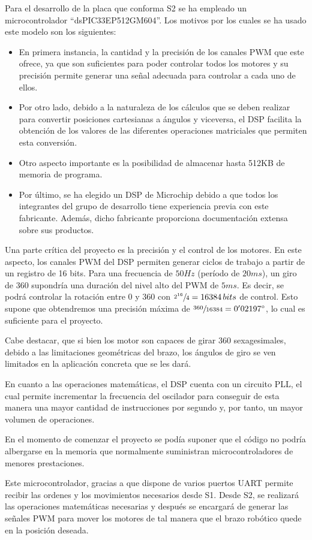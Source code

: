Para el desarrollo de la placa que conforma \ac{S2} se ha empleado un microcontrolador ``dsPIC33EP512GM604''.
Los motivos por los cuales se ha usado este modelo son los siguientes: 

\begin{itemize}
 \item En primera instancia, la cantidad y la precisión de los canales \ac{PWM} que este ofrece, ya que son suficientes para poder controlar todos los motores y su precisión permite generar una señal adecuada para controlar a cada uno de ellos.

 \item Por otro lado, debido a la naturaleza de los cálculos que se deben realizar para convertir posiciones cartesianas a ángulos y viceversa, el \ac{DSP} facilita la obtención de los valores de las diferentes operaciones matriciales que permiten esta conversión.

 \item Otro aspecto importante es la posibilidad de almacenar hasta 512KB de memoria de programa.

 \item Por último, se ha elegido un \ac{DSP} de Microchip debido a que todos los integrantes del grupo de desarrollo tiene experiencia previa con este fabricante. Además, dicho fabricante proporciona documentación extensa sobre sus productos.
\end{itemize}

Una parte crítica del proyecto es la precisión y el control de los motores. En este aspecto, los canales \ac{PWM} del \ac{DSP} permiten generar ciclos de trabajo a partir de un registro de 16 bits. Para una frecuencia de $50Hz$ (período de $20ms$), un giro de 360\degree{} supondría una duración del nivel alto del \ac{PWM} de $5ms$. Es decir, se podrá controlar la rotación entre 0\degree{} y 360\degree{} con $\sfrac{2^{16}}{4} = 16384\,bits$ de control. Esto supone que obtendremos una precisión máxima de $\sfrac{360}{16384} = 0'02197\degree{}$, lo cual es suficiente para el proyecto.

Cabe destacar, que si bien los motor son capaces de girar 360\degree{} sexagesimales, debido a las limitaciones geométricas del brazo, los ángulos de giro se ven limitados en la aplicación concreta que se les dará.

En cuanto a las operaciones matemáticas, el \ac{DSP} cuenta con un circuito \ac{PLL}, el cual permite incrementar la frecuencia del oscilador para conseguir de esta manera una mayor cantidad de instrucciones por segundo y, por tanto, un mayor volumen de operaciones.

En el momento de comenzar el proyecto se podía suponer que el código no podría albergarse en la memoria que normalmente suministran microcontroladores de menores prestaciones.

Este microcontrolador, gracias a que dispone de varios puertos \ac{UART} permite recibir las ordenes y los movimientos necesarios desde \ac{S1}. Desde \ac{S2}, se realizará las operaciones matemáticas necesarias y después se encargará de generar las señales \ac{PWM} para mover los motores de tal manera que el brazo robótico quede en la posición deseada.
